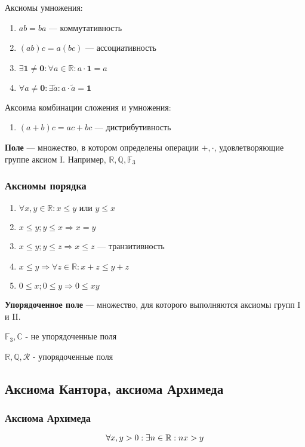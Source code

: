Аксиомы умножения:
\begin{enumerate}
    \item $ab=ba$ --- коммутативность
    \item $(ab)c=a(bc)$ --- ассоциативность
    \item $\exists \bm 1\not =\bm 0: \forall a\in \mathbb{R}: a\cdot\bm 1=a$
    \item $\forall a\not =\bm 0: \exists \tilde{a}: a\cdot \tilde{a}=\bm 1$
\end{enumerate}

Аксоима комбинации сложения и умножения:
\begin{enumerate}
    \item $(a+b)c=ac+bc$ --- дистрибутивность
\end{enumerate}

\textbf{Поле} --- множество, в котором определены операции $+,\cdot$, удовлетворяющие группе аксиом I. Например, $\mathbb{R}, \mathbb{Q}, \mathbb{F}_3$

\subsubsection{Аксиомы порядка}
\begin{enumerate}
    \item $\forall x,y \in \mathbb{R}: x\leq y \text{ или } y\leq x$
    \item $x\leq y; y\leq x \Rightarrow x=y$
    \item $x\leq y; y\leq z \Rightarrow x\leq z$ --- транзитивность
    \item $x\leq y \Rightarrow \forall z\in \mathbb{R}: x+z\leq y+z$
    \item $0\leq x; 0\leq y \Rightarrow 0\leq xy$
\end{enumerate}

\textbf{Упорядоченное поле} --- множество, для которого выполняются аксиомы групп I и II.

$\mathbb{F}_3, \mathbb{C}$ - не упорядоченные поля

$\mathbb{R}, \mathbb{Q}, \mathcal{R}$ - упорядоченные поля

\subsection{Аксиома Кантора, аксиома Архимеда}
\subsubsection{Аксиома Архимеда}
$$\forall x,y>0: \exists n\in \operatorname*{\mathbb{R}}: nx>y$$

